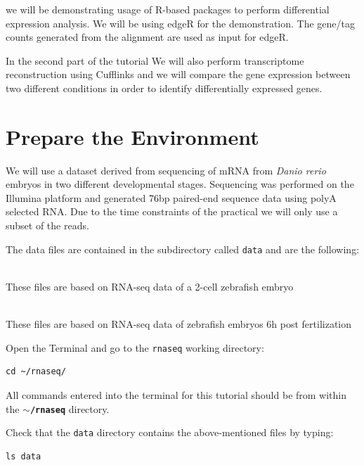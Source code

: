 we will be demonstrating usage of R-based packages to perform differential expression analysis.
We will be using edgeR for the demonstration. The gene/tag counts generated from the alignment are used as input for edgeR.

In the second part of the tutorial We will also perform transcriptome reconstruction using Cufflinks and we will compare
the gene expression between two different conditions in order to identify
differentially expressed genes.

\section{Prepare the Environment}
We will use a dataset derived from sequencing of mRNA from \textit{Danio rerio} embryos
in two different developmental stages. Sequencing was performed on the Illumina
platform and generated 76bp paired-end sequence data using polyA selected RNA.
Due to the time constraints of the practical we will only use a subset of the
reads.

The data files are contained in the subdirectory called \texttt{data} and are
the following:
\begin{description}[style=multiline,labelindent=1.5cm,align=left,leftmargin=2.5cm]
  \item[\texttt{2cells\_1.fastq} and \texttt{2cells\_2.fastq}] \hfill\\
 These files are based on RNA-seq data of a 2-cell zebrafish embryo
  \item[\texttt{6h\_1.fastq} and \texttt{6h\_2.fastq}] \hfill\\
 These files are based on RNA-seq data of zebrafish embryos 6h post
 fertilization
\end{description}

\begin{steps}
Open the Terminal and go to the \texttt{rnaseq} working directory:
\begin{lstlisting}
cd ~/rnaseq/
\end{lstlisting}
\end{steps}

\begin{warning}
  All commands entered into the terminal for this tutorial should be from within the
  \textbf{\texttt{$\sim$/rnaseq}} directory.
\end{warning}

\begin{steps}
Check that the \texttt{data} directory contains the above-mentioned files by typing:
\begin{lstlisting}
ls data
\end{lstlisting}
\end{steps}

